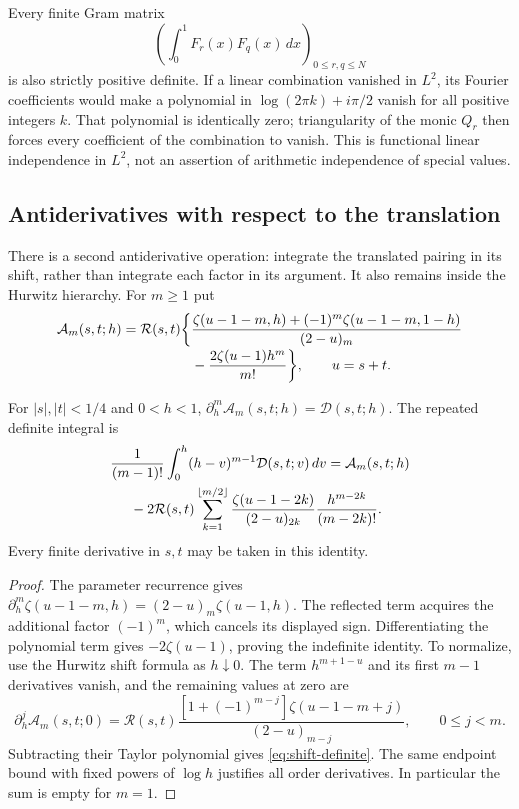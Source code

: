 Every finite Gram matrix
\[ (\int_0^1F_r(x)F_q(x)\,dx)_{0\leq r,q\leq N} \]
is also strictly positive definite. If a linear
combination vanished in $L^2$, its Fourier coefficients would make a
polynomial in $\log(2\pi k)+i\pi/2$ vanish for all positive integers
$k$. That polynomial is identically zero; triangularity of the monic
$Q_r$ then forces every coefficient of the combination to vanish.
This is functional linear independence in $L^2$, not an assertion of
arithmetic independence of special values.

\subsection{Antiderivatives with respect to the translation}

There is a second antiderivative operation: integrate the translated
pairing in its shift, rather than integrate each factor in its argument.
It also remains inside the Hurwitz hierarchy. For $m\geq1$ put
\begin{align}
 \mathcal A_m(s,t;h)=\mathcal R(s,t)\biggl\{
 &\frac{\zeta(u-1-m,h)+(-1)^m\zeta(u-1-m,1-h)}{(2-u)_m}
 \notag\\[-2pt]
 &-\frac{2\zeta(u-1)h^m}{m!}\biggr\},\qquad u=s+t.
 \label{eq:shift-primitive}
\end{align}

\begin{corollary}
\label{cor:shift-primitive}
For $|s|,|t|<1/4$ and $0<h<1$,
$\partial_h^m\mathcal A_m(s,t;h)=\mathcal D(s,t;h)$.
The repeated definite integral is
\begin{align}
 &\frac1{(m-1)!}\int_0^h(h-v)^{m-1}\mathcal D(s,t;v)\,dv
 =\mathcal A_m(s,t;h)\notag\\
 &\hspace{5mm}-2\mathcal R(s,t)
 \sum_{k=1}^{\lfloor m/2\rfloor}
 \frac{\zeta(u-1-2k)}{(2-u)_{2k}}
 \frac{h^{m-2k}}{(m-2k)!}.
 \label{eq:shift-definite}
\end{align}
Every finite derivative in $s,t$ may be taken in this identity.
\end{corollary}

\begin{proof}
The parameter recurrence gives
$\partial_h^m\zeta(u-1-m,h)=(2-u)_m\zeta(u-1,h)$.
The reflected term acquires the additional factor $(-1)^m$, which
cancels its displayed sign. Differentiating the polynomial term gives
$-2\zeta(u-1)$, proving the indefinite identity.
To normalize, use the Hurwitz shift formula as $h\downarrow0$.
The term $h^{m+1-u}$ and its first $m-1$ derivatives vanish, and
the remaining values at zero are
\[
 \partial_h^j\mathcal A_m(s,t;0)
 =\mathcal R(s,t)
 \frac{[1+(-1)^{m-j}]\zeta(u-1-m+j)}{(2-u)_{m-j}},
 \qquad 0\leq j<m.
\]
Subtracting their Taylor polynomial gives \eqref{eq:shift-definite}.
The same endpoint bound with fixed powers of $\log h$ justifies all
order derivatives. In particular the sum is empty for $m=1$.
\end{proof}
